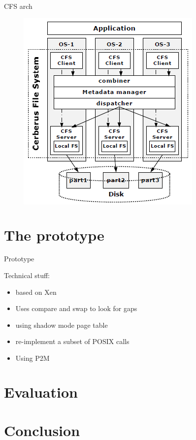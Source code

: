 \documentclass{beamer}
\begin{document}
	\begin{frame}{CFS arch}

		\begin{figure} [H]
			\centering
			\includegraphics[scale=0.40]{img/cerberus-cfs}
		\end{figure}	

	\end{frame}

\section{The prototype}

	\begin{frame}{Prototype}

	Technical stuff:
	\begin{itemize}
	\item based on Xen
	\item Uses compare and swap to look for gaps
	\item using shadow mode page table
	\item re-implement a subset of POSIX calls
	\item Using P2M
	\end{itemize}
	
	\end{frame}

\section{Evaluation}

\section{Conclusion}
\end{document}
